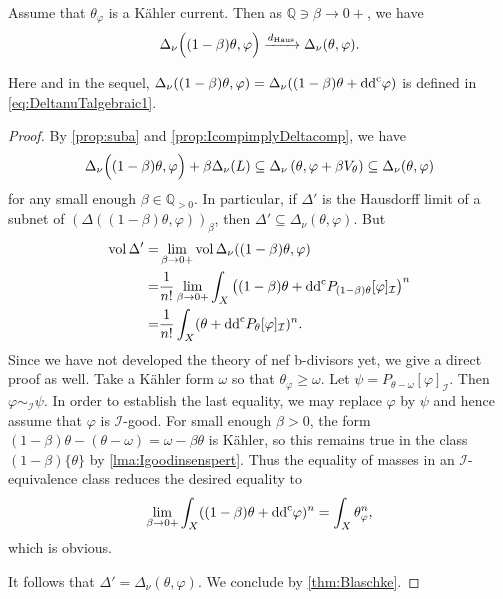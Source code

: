 \begin{lemma}\label{lma:Hausconvbetato0}
    Assume that $\theta_{\varphi}$ is a Kähler current. Then as $\mathbb{Q}\ni\beta\to 0+$, we have
    \[
        \Delta_{\nu}\Bigl((1-\beta)\theta,\varphi\Bigr)\xrightarrow{d_{\mathrm{Haus}}} \Delta_{\nu}(\theta,\varphi).
    \]
\end{lemma}
Here and in the sequel, $\Delta_{\nu}((1-\beta)\theta,\varphi)=\Delta_{\nu}((1-\beta)\theta+\mathrm{dd}^{\mathrm{c}}\varphi)$ is defined in \eqref{eq:DeltanuTalgebraic1}.
\begin{proof}
    By \cref{prop:suba} and \cref{prop:IcompimplyDeltacomp}, we have
    \[
        \Delta_{\nu}\Bigl((1-\beta)\theta,\varphi\Bigr)+\beta\Delta_{\nu}(L)\subseteq \Delta_\nu\left(\theta,\varphi+\beta V_\theta\right)\subseteq \Delta_{\nu}(\theta,\varphi)
    \]
    for any small enough $\beta\in \mathbb{Q}_{>0}$.
    In particular, if $\Delta'$ is the Hausdorff limit of a subnet of $(\Delta((1-\beta)\theta,\varphi))_{\beta}$, then $\Delta'\subseteq \Delta_{\nu}(\theta,\varphi)$.
    But
    \[
    \begin{split}
        \operatorname{vol} \Delta'=&\lim_{\beta\to 0+}\operatorname{vol} \Delta_{\nu}((1-\beta)\theta,\varphi)\\
        =&\frac{1}{n!}\lim_{\beta\to 0+}\int_X \left((1-\beta)\theta+\mathrm{dd}^{\mathrm{c}} P_{(1-\beta)\theta}[\varphi]_{\mathcal{I}}\right)^n\\
        =&\frac{1}{n!}\int_X (\theta+\mathrm{dd}^{\mathrm{c}} P_{\theta}[\varphi]_{\mathcal{I}})^n.
    \end{split}
    \]
    Since we have not developed the theory of nef b-divisors yet, we give a direct proof as well. Take a Kähler form $\omega$ so that $\theta_{\varphi}\geq \omega$. Let $\psi=P_{\theta-\omega}[\varphi]_{\mathcal{I}}$. Then $\varphi\sim_{\mathcal{I}}\psi$. In order to establish the last equality, we may replace $\varphi$ by $\psi$ and hence assume that $\varphi$ is $\mathcal{I}$-good. For small enough $\beta>0$, the form $(1-\beta)\theta-(\theta-\omega)=\omega-\beta\theta$ is Kähler, so this remains true in the class $(1-\beta)\{\theta\}$ by \cref{lma:Igoodinsenspert}. Thus the equality of masses in an $\mathcal{I}$-equivalence class reduces the desired equality to
    \[
    \lim_{\beta\to 0+}\int_X ((1-\beta)\theta+\mathrm{dd}^{\mathrm{c}} \varphi)^n=\int_X \theta_{\varphi}^n,
    \]
    which is obvious.

    It follows that $\Delta'=\Delta_{\nu}(\theta,\varphi)$. We conclude by \cref{thm:Blaschke}.
\end{proof}



